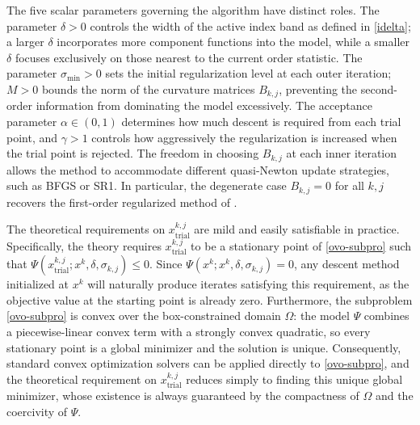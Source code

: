 \documentclass[11pt]{article}
\newcommand{\xkjtrial}{x^{k,j}_{\mathrm{trial}}}
\begin{document}
The five scalar parameters governing the algorithm have distinct 
roles. The parameter $\delta > 0$ controls the width of the active 
index band as defined in \eqref{idelta}; a larger $\delta$ incorporates 
more component functions into the model, while a smaller $\delta$ 
focuses exclusively on those nearest to the current order statistic. 
The parameter $\sigma_{\min} > 0$ sets the initial regularization 
level at each outer iteration; $M > 0$ bounds the norm of the 
curvature matrices $B_{k,j}$, preventing the second-order information 
from dominating the model excessively. The acceptance parameter 
$\alpha \in (0,1)$ determines how much descent is required from each 
trial point, and $\gamma > 1$ controls how aggressively the 
regularization is increased when the trial point is rejected. The 
freedom in choosing $B_{k,j}$ at each inner iteration allows the 
method to accommodate different quasi-Newton update strategies, such 
as BFGS or SR1. In particular, the degenerate case $B_{k,j} = 0$ 
for all $k, j$ recovers the first-order regularized method of 
\cite{AlvarezBirgin2025}.

The theoretical requirements on $\xkjtrial$ are mild and easily 
satisfiable in practice. Specifically, the theory requires 
$\xkjtrial$ to be a stationary point of \eqref{ovo-subpro} such that 
$\Psi(\xkjtrial; x^k, \delta, \sigma_{k,j}) \leq 0$. Since 
$\Psi(x^k; x^k, \delta, \sigma_{k,j}) = 0$, any descent method 
initialized at $x^k$ will naturally produce iterates satisfying this 
requirement, as the objective value at the starting point is already 
zero. Furthermore, the subproblem \eqref{ovo-subpro} is convex over 
the box-constrained domain $\Omega$: the model $\Psi$ combines a 
piecewise-linear convex term with a strongly convex quadratic, so 
every stationary point is a global minimizer and the solution is 
unique. Consequently, standard convex optimization solvers can be 
applied directly to \eqref{ovo-subpro}, and the theoretical 
requirement on $\xkjtrial$ reduces simply to finding this unique 
global minimizer, whose existence is always guaranteed by the 
compactness of $\Omega$ and the coercivity of $\Psi$.
\end{document}
